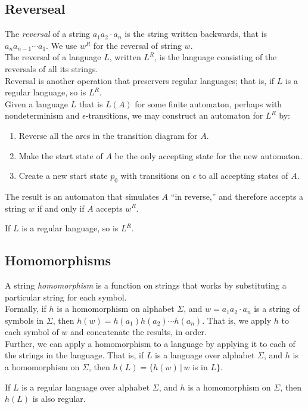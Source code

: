 \documentclass[]{article}
\begin{document}
  \subsection*{Reverseal}
    The \emph{reversal} of a string $a_1a_2\cdot{a_n}$ is the string written
    backwards, that is $a_na_{n-1}\cdots{a_1}$. We use $w^R$ for the reversal
    of string $w$. \\
    \indent The reversal of a language $L$, written $L^R$, is the language
    consisting of the reversals of all its strings. \\
    \indent Reversal is another operation that preservers regular languages;
    that is, if $L$ is a regular language, so is $L^R$. \\
    \indent Given a language $L$ that is $L(A)$ for some finite automaton,
    perhaps with nondeterminism and $\epsilon$-transitions, we may construct an
    automaton for $L^R$ by:
      \begin{enumerate}
        \item Reverse all the arcs in the transition diagram for $A$.
        \item Make the start state of $A$ be the only accepting state for the
        new automaton.
        \item Create a new start state $p_0$ with transitions on $\epsilon$ to
        all accepting states of $A$.
      \end{enumerate}
    The result is an automaton that simulates $A$ ``in reverse,'' and therefore
    accepts a string $w$ if and only if $A$ accepts $w^R$.
      \begin{thm}
        If $L$ is a regular language, so is $L^R$.
      \end{thm}

  \subsection*{Homomorphisms}
    A string \emph{homomorphism} is a function on strings that works by
    substituting a particular string for each symbol. \\
    \indent Formally, if $h$ is a homomorphism on alphabet $\Sigma$, and
    $w = a_1a_2\cdot{a_n}$ is a string of symbols in $\Sigma$, then
    $h(w) = h(a_1)h(a_2)\cdots{h(a_n)}$. That is, we apply $h$ to each symbol of
    $w$ and concatenate the results, in order. \\
    \indent Further, we can apply a homomorphism to a language by applying it to
    each of the strings in the language. That is, if $L$ is a language over
    alphabet $\Sigma$, and $h$ is a homomorphism on $\Sigma$, then
    $h(L) = \{h(w) \, | \, w$ is in $L \}$.
      \begin{thm}
        If $L$ is a regular language over alphabet $\Sigma$, and $h$ is a
        homomorphism on $\Sigma$, then $h(L)$ is also regular.
      \end{thm}
\end{document}
